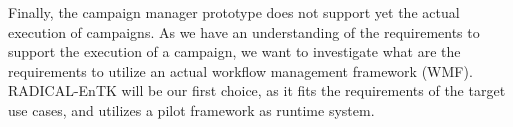 Finally, the campaign manager prototype does not support yet the actual 
execution of campaigns. As we have an understanding of the requirements to 
support the execution of a campaign, we want to investigate what are the 
requirements to utilize an actual workflow management framework (WMF).
RADICAL-EnTK will be our first choice, as it fits the requirements of the 
target use cases, and utilizes a pilot framework as runtime system.
